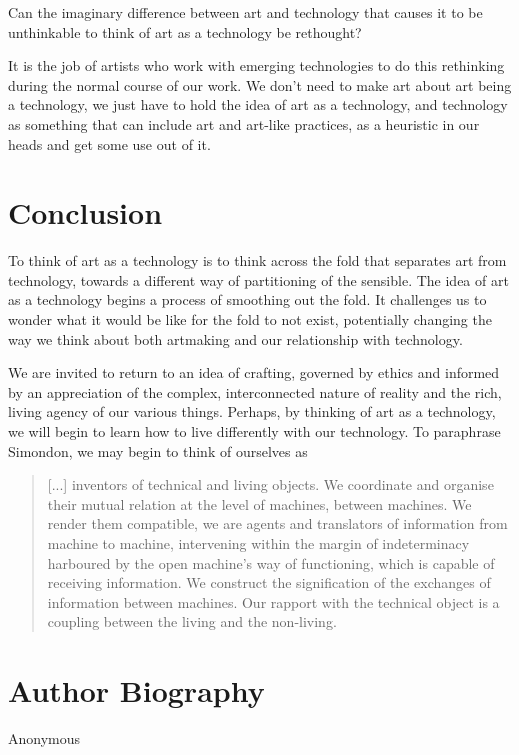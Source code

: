 \documentclass[letterpaper]{article}
\begin{document}
    Can the imaginary difference between art and technology that causes it to be unthinkable to think of art as a technology be rethought?
    
    It is the job of artists who work with emerging technologies to do this rethinking during the normal course of our work. We don't need to make art about art being a technology, we just have to hold the idea of art as a technology, and technology as something that can include art and art-like practices, as a heuristic in our heads and get some use out of it.
    


\section{Conclusion}

    To think of art as a technology is to think across the fold that separates art from technology, towards a different way of partitioning of the sensible. The idea of art as a technology begins a process of smoothing out the fold. It challenges us to wonder what it would be like for the fold to not exist, potentially changing the way we think about both artmaking and our relationship with technology.
    
    We are invited to return to an idea of crafting, governed by ethics and informed by an appreciation of the complex, interconnected nature of reality and the rich, living agency of our various things. Perhaps, by thinking of art as a technology, we will begin to learn how to live differently with our technology. To paraphrase Simondon, we may begin to think of ourselves as
    
    \begin{quote}
        [...] inventors of technical and living objects. We coordinate and organise their mutual relation at the level of machines, between machines. We render them compatible, we are agents and translators of information from machine to machine, intervening within the margin of indeterminacy harboured by the open machine's way of functioning, which is capable of receiving information. We construct the signification of the exchanges of information between machines. Our rapport with the technical object is a coupling between the living and the non-living. \citep[p.xvi]{SimondonOnThMdOfExstncOfTechnclObjcts1980}
    \end{quote}




\section{Author Biography}

Anonymous 
\end{document}
